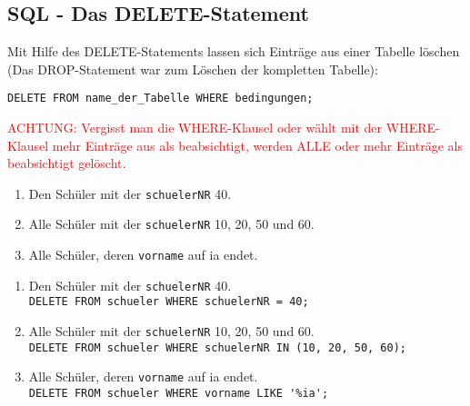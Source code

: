 \subsection[DELETE-Statement]{SQL - Das DELETE-Statement}\label{delete}
Mit Hilfe des DELETE-Statements lassen sich Einträge aus einer Tabelle löschen (Das DROP-Statement war zum Löschen der kompletten Tabelle):
\begin{tcolorbox}[title=DELETE-Statement]
	\lstinline!DELETE FROM name_der_Tabelle WHERE bedingungen;!
\end{tcolorbox}
\textcolor{red}{ACHTUNG: Vergisst man die WHERE-Klausel oder wählt mit der WHERE-Klausel mehr Einträge aus als beabsichtigt, werden ALLE oder mehr Einträge als beabsichtigt gelöscht.}

\begin{Exercise}[title={Lösche folgende Einträge aus der Datenbank:}, label=Delete]
	\begin{enumerate}
		\item Den Schüler mit der \lstinline!schuelerNR! 40.
		\item Alle Schüler mit der \lstinline!schuelerNR! 10, 20, 50 und 60.
		\item Alle Schüler, deren \lstinline!vorname! auf ia endet.
	\end{enumerate}
\end{Exercise}
\begin{Answer}[ref=Delete]
	\begin{enumerate}
		\item Den Schüler mit der \lstinline!schuelerNR! 40.\\
		\lstinline!DELETE FROM schueler WHERE schuelerNR = 40;!
		\item Alle Schüler mit der \lstinline!schuelerNR! 10, 20, 50 und 60.\\
		\lstinline!DELETE FROM schueler WHERE schuelerNR IN (10, 20, 50, 60);!
		\item Alle Schüler, deren \lstinline!vorname! auf ia endet.\\
		\lstinline!DELETE FROM schueler WHERE vorname LIKE '%ia';!
	\end{enumerate}
\end{Answer}